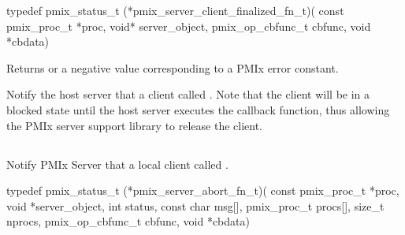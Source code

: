 \format

\cspecificstart
\begin{codepar}
typedef pmix_status_t (*pmix_server_client_finalized_fn_t)(
                             const pmix_proc_t *proc, void* server_object,
                             pmix_op_cbfunc_t cbfunc, void *cbdata)
\end{codepar}
\cspecificend

\begin{arglist}
\end{arglist}

Returns  or a negative value corresponding to a PMIx error constant.

\descr

Notify the host server that a client called .
Note that the client will be in a blocked state until the host server executes the callback function, thus allowing the PMIx server support library to release the client.


\subsection{}

\summary

Notify PMIx Server that a local client called .

\format

\cspecificstart
\begin{codepar}
typedef pmix_status_t (*pmix_server_abort_fn_t)(
                             const pmix_proc_t *proc, void *server_object,
                             int status, const char msg[],
                             pmix_proc_t procs[], size_t nprocs,
                             pmix_op_cbfunc_t cbfunc, void *cbdata)
\end{codepar}
\cspecificend


\begin{arglist}
\end{arglist}

